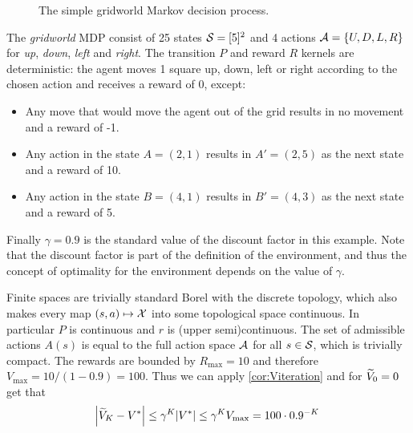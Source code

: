 \begin{example}[Gridworld]
  \begin{figure}[h]
    \centering
    \caption{The simple gridworld Markov decision process.}
  \end{figure}
  The \emph{gridworld} MDP consist of 25 states $\mathcal{S} = [5]^2$ and 4 actions
  $\mathcal{A} = \{U, D, L, R\}$ for \emph{up}, \emph{down}, \emph{left} and 
  \emph{right}. The transition $P$ and reward $R$ kernels are deterministic:
  the agent moves 1 square up, down, left or right according to the chosen
  action and receives a reward of 0, except:
  \begin{itemize}
    \item Any move that would move the
      agent out of the grid results in no movement and a reward of -1.
    \item Any action in the state $A = (2,1)$ results in $A' = (2,5)$ as
      the next state and a reward of 10.
    \item Any action in the state $B = (4,1)$ results in $B' = (4,3)$ as
      the next state and a reward of 5.
  \end{itemize}
  Finally $\gamma = 0.9$ is the standard value of the discount factor
  in this example.
  Note that the discount factor is part of the definition of the environment,
  and thus the concept of optimality for the environment depends on the
  value of $\gamma$.

  Finite spaces are trivially standard Borel with the discrete topology,
  which also makes every map $(s, a) \mapsto \mathcal{X}$ into some
  topological space continuous. In particular $P$ is continuous and
  $r$ is (upper semi)continuous.
  The set of admissible actions $A(s)$ is equal to the
  full action space $\mathcal{A}$ for all $s \in \mathcal{S}$, which is trivially
  compact.
  The rewards are bounded by $R_{\max} = 10$
  and therefore $V_{\max} = 10/(1-0.9) = 100$.
  Thus we can apply \cref{cor:Viteration} and for $\widetilde{V}_0 = 0$ get that
  \[ \abs{\widetilde{V}_K - V^*} \leq \gamma^K \abs{V^*}
  \leq \gamma^K V_{\max} = 100 \cdot 0.9^{-K} \]
  

\end{example}
